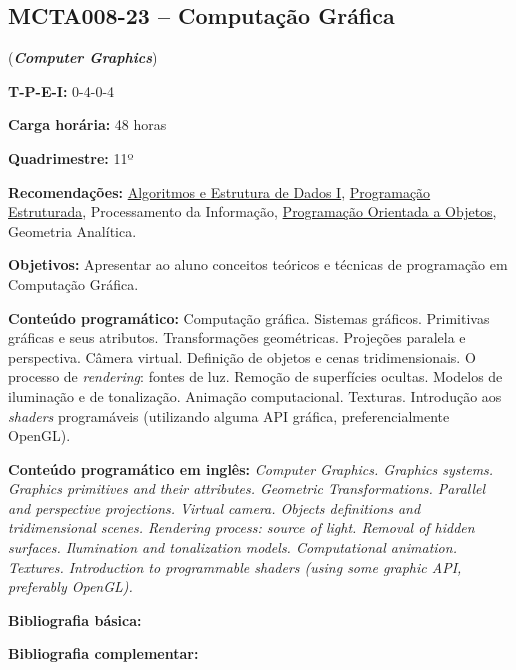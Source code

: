 \documentclass[class=article, crop=false]{standalone}
\begin{document}
\subsection{MCTA008-23 -- Computação Gráfica}
\label{disc:cg}

(\textbf{\textit{Computer Graphics}})

\begin{center}
    \begin{minipage}{0.85\textwidth}
        \textbf{T-P-E-I:} 0-4-0-4
        
        \textbf{Carga horária:} 48 horas
        
        \textbf{Quadrimestre:} 11º
        
        \textbf{Recomendações:}
        \hyperref[disc:aedI]{Algoritmos e Estrutura de Dados I},
        \hyperref[disc:pe]{Programação Estruturada},
        Processamento da Informação, 
        \hyperref[disc:poo]{Programação Orientada a Objetos},
        Geometria Analítica.
    \end{minipage}
\end{center}

\textbf{Objetivos:}
Apresentar ao aluno conceitos teóricos e técnicas de programação em Computação
Gráfica.

\textbf{Conteúdo programático:}
Computação gráfica.
Sistemas gráficos.
Primitivas gráficas e seus atributos.
Transformações geométricas.
Projeções paralela e perspectiva.
Câmera virtual.
Definição de objetos e cenas tridimensionais.
O processo de \textit{rendering}: fontes de luz.
Remoção de superfícies ocultas.
Modelos de iluminação e de tonalização.
Animação computacional.
Texturas.
Introdução aos \textit{shaders} programáveis (utilizando alguma API gráfica, preferencialmente OpenGL).

\textbf{Conteúdo programático em inglês:}
\textit{Computer Graphics.
Graphics systems.
Graphics primitives and their attributes.
Geometric Transformations.
Parallel and perspective projections.
Virtual camera.
Objects definitions and tridimensional scenes.
Rendering process: source of light.
Removal of hidden surfaces.
Ilumination and tonalization models.
Computational animation.
Textures.
Introduction to programmable shaders (using some graphic API, preferably OpenGL).}

\newrefsection
\textbf{Bibliografia básica:}
\nocite{2008-gomes-etal,2003-azevedo-etal,2020-vries}
\printbibliography

\newrefsection
\textbf{Bibliografia complementar:}
\nocite{2003-edward,2004-edward,2009-bailey-etal,2005-shreiner-etal,2016-kessenich-etal}
\printbibliography
\end{document}
